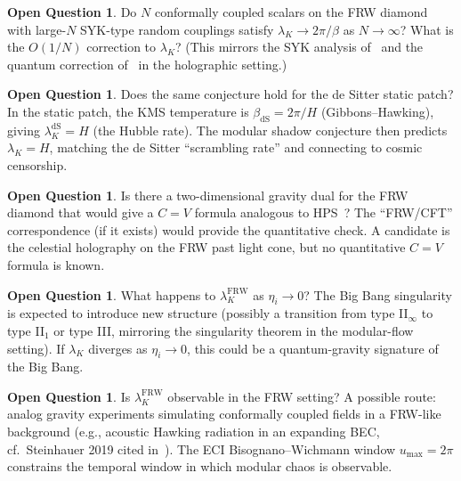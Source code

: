\documentclass[12pt,a4paper]{article}
\theoremstyle{definition}
\newtheorem{question}[theorem]{Open Question}
\newcommand{\lK}{\lambda_K}
\newcommand{\FRW}{\mathrm{FRW}}
\newcommand{\dS}{\mathrm{dS}}
\begin{document}
\begin{question}\label{q:large-N}
  Do $N$ conformally coupled scalars on the FRW diamond with large-$N$
  SYK-type random couplings satisfy $\lK \to 2\pi/\beta$ as $N \to \infty$?
  What is the $O(1/N)$ correction to $\lK$?
  (This mirrors the SYK analysis of~\cite{Parker2019} and the quantum
  correction of~\cite{HPS2024} in the holographic setting.)
\end{question}

\begin{question}\label{q:dS}
  Does the same conjecture hold for the de Sitter static patch?
  In the static patch, the KMS temperature is $\beta_\dS = 2\pi/H$
  (Gibbons--Hawking), giving $\lK^\dS = H$ (the Hubble rate).
  The modular shadow conjecture then predicts $\lK = H$, matching the
  de Sitter ``scrambling rate'' and connecting to cosmic censorship.
\end{question}

\begin{question}\label{q:holo-FRW}
  Is there a two-dimensional gravity dual for the FRW diamond that would
  give a $C = V$ formula analogous to HPS~\cite{HPS2024}?
  The ``FRW/CFT'' correspondence (if it exists) would provide the
  quantitative check. A candidate is the celestial holography on the
  FRW past light cone, but no quantitative $C = V$ formula is known.
\end{question}

\begin{question}\label{q:bigbang}
  What happens to $\lK^\FRW$ as $\eta_i \to 0$?
  The Big Bang singularity is expected to introduce new structure
  (possibly a transition from type II$_\infty$ to type II$_1$ or
  type III, mirroring the singularity theorem in the modular-flow setting).
  If $\lK$ diverges as $\eta_i \to 0$, this could be a quantum-gravity
  signature of the Big Bang.
\end{question}

\begin{question}\label{q:observable}
  Is $\lK^\FRW$ observable in the FRW setting?
  A possible route: analog gravity experiments simulating conformally
  coupled fields in a FRW-like background (e.g., acoustic Hawking radiation
  in an expanding BEC, cf.\ Steinhauer 2019 cited in~\cite{ECI_v6}).
  The ECI Bisognano--Wichmann window $u_\mathrm{max} = 2\pi$ constrains
  the temporal window in which modular chaos is observable.
\end{question}
\end{document}
